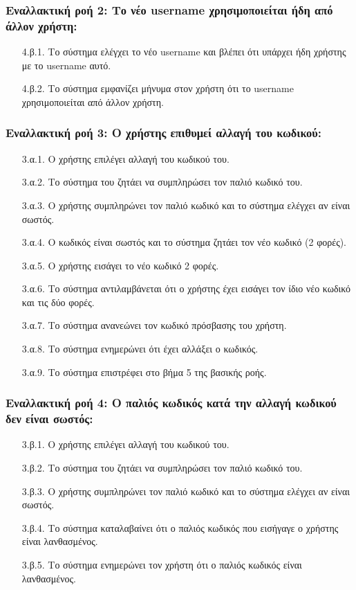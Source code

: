\documentclass[12pt,a4paper]{article}
\begin{document}
\subsubsection*{Εναλλακτική ροή 2: Το νέο username χρησιμοποιείται ήδη από άλλον χρήστη:}
\begin{enumerate}
    \item [4.β.1.] Το σύστημα ελέγχει το νέο username και βλέπει ότι υπάρχει ήδη χρήστης με το username αυτό. 
    \item [4.β.2.] Το σύστημα εμφανίζει μήνυμα στον χρήστη ότι το username χρησιμοποιείται από άλλον χρήστη.  
\end{enumerate}

\subsubsection*{Εναλλακτική ροή 3: Ο χρήστης επιθυμεί αλλαγή του κωδικού:}
\begin{enumerate}
    \item [3.α.1.] Ο χρήστης επιλέγει αλλαγή του κωδικού του. 
    \item [3.α.2.] Το σύστημα του ζητάει να συμπληρώσει τον παλιό κωδικό του.
    \item [3.α.3.] Ο χρήστης συμπληρώνει τον παλιό κωδικό και το σύστημα ελέγχει αν είναι σωστός.
    \item [3.α.4.] Ο κωδικός είναι σωστός και το σύστημα ζητάει τον νέο κωδικό (2 φορές).
    \item [3.α.5.] Ο χρήστης εισάγει το νέο κωδικό 2 φορές.
    \item [3.α.6.] Το σύστημα αντιλαμβάνεται ότι ο χρήστης έχει εισάγει τον ίδιο νέο κωδικό και τις δύο φορές.
    \item [3.α.7.] Το σύστημα ανανεώνει τον κωδικό πρόσβασης του χρήστη.
    \item [3.α.8.] Το σύστημα ενημερώνει ότι έχει αλλάξει ο κωδικός.
    \item [3.α.9.] Το σύστημα επιστρέφει στο βήμα 5 της βασικής ροής.
\end{enumerate}

\subsubsection*{Εναλλακτική ροή 4: Ο παλιός κωδικός κατά την αλλαγή κωδικού δεν είναι σωστός:}
\begin{enumerate}
    \item [3.β.1.] Ο χρήστης επιλέγει αλλαγή του κωδικού του.
    \item [3.β.2.] Το σύστημα του ζητάει να συμπληρώσει τον παλιό κωδικό του.
    \item [3.β.3.] Ο χρήστης συμπληρώνει τον παλιό κωδικό και το σύστημα ελέγχει αν είναι σωστός.

    \item [3.β.4.] Το σύστημα καταλαβαίνει ότι ο παλιός κωδικός που εισήγαγε ο χρήστης είναι λανθασμένος.
    \item [3.β.5.] Το σύστημα ενημερώνει τον χρήστη ότι ο παλιός κωδικός είναι λανθασμένος.
\end{enumerate}
\end{document}
